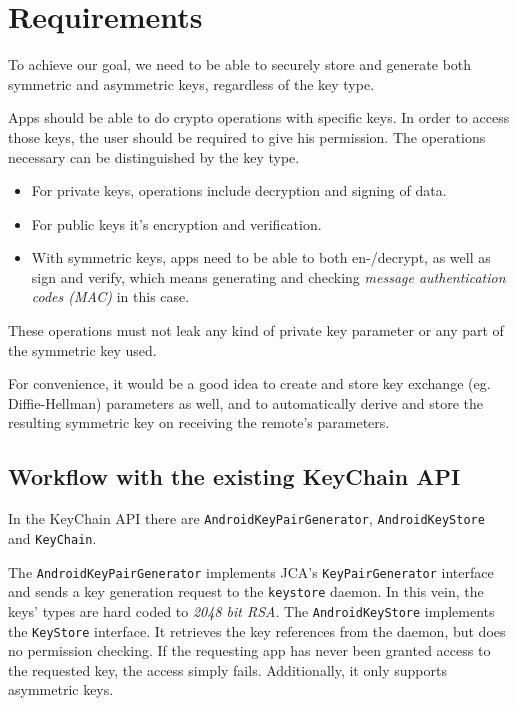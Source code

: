 \documentclass[a4paper,bibtotoc,draft]{scrartcl}
\begin{document}
	\section{Requirements}
		To achieve our goal, we need to be able to securely store and generate both symmetric and asymmetric keys, regardless of the key type.

		Apps should be able to do crypto operations with specific keys. In order to access those keys, the user should be required to give his permission. The operations necessary can be distinguished by the key type.
		\begin{itemize}
			\item For private keys, operations include decryption and signing of data.
			\item For public keys it's encryption and verification.
			\item With symmetric keys, apps need to be able to both en-/decrypt, as well as sign and verify, which means generating and checking {\em message authentication codes (MAC)} in this case.
		\end{itemize}

		These operations must not leak any kind of private key parameter or any part of the symmetric key used.

		For convenience, it would be a good idea to create and store key exchange (eg. Diffie-Hellman) parameters as well, and to automatically derive and store the resulting symmetric key on receiving the remote's parameters. %

	\subsection{Workflow with the existing KeyChain API}
		In the KeyChain API there are \texttt{AndroidKeyPairGenerator}, \texttt{AndroidKeyStore} \linebreak and \texttt{KeyChain}.

		The \texttt{AndroidKeyPairGenerator} implements JCA's \texttt{KeyPairGenerator} interface and sends a key generation request to the \texttt{keystore} daemon. In this vein, the keys' types are hard coded to {\em 2048 bit RSA}. The \texttt{AndroidKeyStore} implements the \texttt{KeyStore} interface. It retrieves the key references from the daemon, but does no permission checking. If the requesting app has never been granted access to the requested key, the access simply fails. Additionally, it only supports asymmetric keys.
\end{document}
